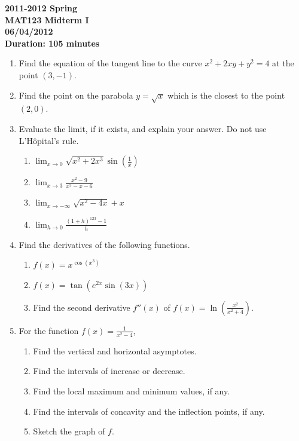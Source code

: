 \documentclass[a4paper, 12pt]{article}
\begin{document}
\pagestyle{empty}

\begin{center}
\textbf{2011-2012 Spring \\MAT123 Midterm I\\06/04/2012\\Duration: 105 minutes}
\end{center}

\begin{enumerate}[leftmargin=*,label=\textbf{\arabic*.}]

\item Find the equation of the tangent line to the curve $x^2+2xy+y^2=4$ at the point $(3,-1)$.

\item Find the point on the parabola $y=\sqrt x$ which is the closest to the point $(2,0)$.

\item Evaluate the limit, if it exists, and explain your answer. Do not use L'Hôpital's rule.

\begin{enumerate}[leftmargin=*,label=\textbf{\alph*.}]
\item $\displaystyle\lim_{x\to0}\sqrt{x^2+2x^3} \sin\left(\frac1x\right)$ \ \ \ \item $\displaystyle \lim_{x\to3}\frac{x^2-9}{x^2-x-6}$ \ \ \ \item $\displaystyle \lim_{x\to-\infty}\sqrt{x^2-4x}+x$

\item $\displaystyle\lim_{h\to0}\frac{(1+h)^{123}-1}{h}$
\end{enumerate}

\item Find the derivatives of the following functions.

\begin{enumerate}[leftmargin=*,label=\textbf{\alph*.}]
\item $f(x)=x^{\cos\left(x^3\right)}$ \ \ \ \item $f(x) = \tan\left( e^{2x}\sin(3x)\right)$

\item Find the second derivative $f''(x)$ of $\displaystyle f(x) =\ln\left(\frac{x^2}{x^2+4}\right)$.
\end{enumerate}

\item For the function $\displaystyle f(x)=\frac{1}{x^2-4}$,

\begin{enumerate}[leftmargin=*,label=\textbf{\alph*.}]
\item Find the vertical and horizontal asymptotes.
\item Find the intervals of increase or decrease.
\item Find the local maximum and minimum values, if any.
\item Find the intervals of concavity and the inflection points, if any.
\item Sketch the graph of $f$.
\end{enumerate}

\end{enumerate}
\end{document}
